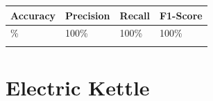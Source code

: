 
{\def\LTcaptype{none} %
\begin{longtable}[]{@{}llll@{}}
\toprule\noalign{}
\textbf{Accuracy} & \textbf{Precision} & \textbf{Recall} &
\textbf{F1-Score} \\
\midrule\noalign{}
\endhead
100\% & 100\% & 100\% & 100\% \\
\bottomrule\noalign{}
\end{longtable}
}

\section{Electric Kettle}\label{appendix-e.3.-arc-fault-test-result-for-electric-kettle}


